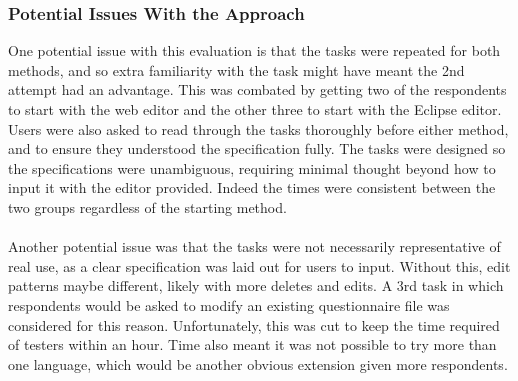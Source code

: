 \documentclass{article}
\begin{document}
{%

% 




\subsubsection{Potential Issues With the Approach}
One potential issue with this evaluation is that the tasks were repeated for both methods, and so extra familiarity with the task might have meant the 2nd attempt had an advantage. This was combated by getting two of the respondents to start with the web editor and the other three to start with the Eclipse editor. Users were also asked to read through the tasks thoroughly before either method, and to ensure they understood the specification fully. The tasks were designed so the specifications were unambiguous, requiring minimal thought beyond how to input it with the editor provided. Indeed the times were consistent between the two groups regardless of the starting method.
\\
\\
Another potential issue was that the tasks were not necessarily representative of real use, as a clear specification was laid out for users to input. Without this, edit patterns maybe different, likely with more deletes and edits. A 3rd task in which respondents would be asked to modify an existing questionnaire file was considered for this reason. Unfortunately, this was cut to keep the time required of testers within an hour. Time also meant it was not possible to try more than one language, which would be another obvious extension given more respondents.
}
\end{document}
